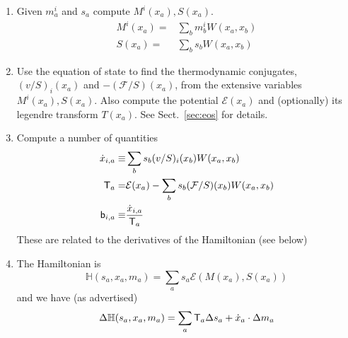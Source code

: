 \documentclass[12pt,aps,preprint,nofootinbib,noshowkeys,noshowpacs,longbibliography,superscriptaddress,tightenlines]{revtex4-2}
\def\bbeta{{\sf b}}
\def\Teff{{\sf T}}
\def\F{{\mathcal F}}
\def\Sect#1{Sect.~\ref{#1}}
\def\st{\begin{equation}}
\def\stp{\end{equation}}
\def\E{{\mathcal E}}
\begin{document}
\begin{enumerate}
    \item Given $m_a^i$ and  $s_a$  compute $M^i(x_a), S(x_a)$. 
	\begin{align}
	    M^i(x_a) =& \sum_b m_b^i W(x_a, x_b) \\
	    S(x_a) =& \sum_b s_b W(x_a, x_b)
	\end{align}

    \item Use the equation of state to find  the thermodynamic conjugates,  $(v/S)_i(x_a)$ and  $-(\F/S)(x_a)$,  from the extensive variables $M^i(x_a), S(x_a)$.  
      Also compute the potential $\E(x_a)$ and (optionally) its legendre transform $T(x_a)$. See  \Sect{sec:eos} for details.

\item Compute a number of quantities
    \begin{align}
	\dot x_{i, a} \equiv& \sum_b s_b (v/S)_i (x_b) W(x_a, x_b) \\
	\Teff_a =& \E(x_a)  - \sum_b s_b (\F/S)(x_b) W(x_a, x_b)  \\
	\bbeta_{i, a} \equiv&  \frac{\dot x_{i, a}}{\Teff_a}
    \end{align}
These are related to the derivatives of the Hamiltonian (see below)
\item  
The Hamiltonian is 
\st
{\mathbb H}(s_a, x_a, m_a)  = \sum_a s_a \E(M(x_a), S(x_a))
\stp
and we have (as advertised)
\st
\Delta {\mathbb H} (s_a, x_a, m_a)  =  \sum_a \Teff_a  \Delta s_a  + \dot x_{a} \cdot  \Delta m_a 
\stp


\end{enumerate}
\end{document}
